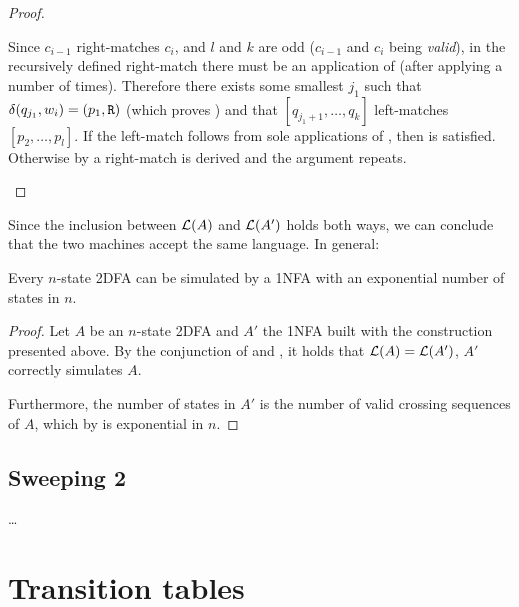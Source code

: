 \begin{proof}
\begin{description}
		      Since $c_{i-1}$ right-matches $c_i$, and $l$ and $k$ are odd ($c_{i-1}$ and $c_i$ being \emph{valid}), in the recursively defined right-match there must be an application of  (after applying  a number of times).
		      Therefore there exists some smallest $j_1$ such that $\delta(q_{j_1},w_i)=(p_1,\mathtt R)$ (which proves ) and that $[q_{j_1+1},\dots,q_k]$ left-matches $[p_2,\dots,p_l]$.
		      If the left-match follows from sole applications of , then  is satisfied.
		      Otherwise by  a right-match is derived and the argument repeats. \qedhere
	\end{description}
\end{proof}

Since the inclusion between $\mathcal L(A)$ and $\mathcal L(A')$ holds both ways, we can conclude that the two machines accept the same language.
In general:
\begin{thrm}
	Every $n$-state 2DFA can be simulated by a 1NFA with an exponential number of states in $n$.
\end{thrm}
\begin{proof}
	Let $A$ be an $n$-state 2DFA and $A'$ the 1NFA built with the construction presented above.
	By the conjunction of  and , it holds that $\mathcal L(A)=\mathcal L(A')$, \ie $A'$ correctly simulates $A$.

	Furthermore, the number of states in $A'$ is the number of valid crossing sequences of $A$, which by  is exponential in $n$.
\end{proof}



\subsection{Sweeping 2\DFAs}
\dots


\section{Transition tables}\label{sec:transtab2DFA}

